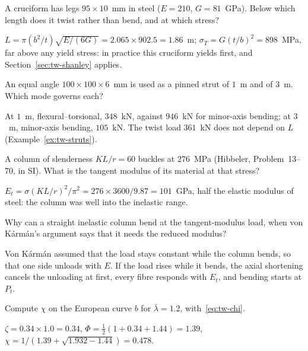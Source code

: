 \label{exo:tw-crossover}
%
A cruciform has legs $95\times10$~mm in steel ($E = 210$, $G = 81$~GPa). Below which length does it twist rather
than bend, and at which stress?
\begin{solution}
$L = \pi(b^2/t)\sqrt{E/(6G)} = 2.065\times902.5 = 1.86$~m; $\sigma_T = G(t/b)^2 = 898$~MPa, far above any yield
stress: in practice this cruciform yields first, and Section~\ref{sec:tw-shanley} applies.
\end{solution}

\label{exo:tw-whichmode}
%
An equal angle $100\times100\times6$~mm is used as a pinned strut of $1$~m and of $3$~m. Which mode governs each?
\begin{solution}
At $1$~m, flexural--torsional, $348$~kN, against $946$~kN for minor-axis bending; at $3$~m, minor-axis
bending, $105$~kN. The twist load $361$~kN does not depend on $L$ (Example~\ref{ex:tw-struts}).
\end{solution}

\label{exo:tw-et}
%
A column of slenderness $KL/r = 60$ buckles at $276$~MPa (Hibbeler, Problem~13--70, in SI). What is the tangent
modulus of its material at that stress?
\begin{solution}
$E_t = \sigma(KL/r)^2/\pi^2 = 276\times3600/9.87 = 101$~GPa, half the elastic modulus of steel: the column was well
into the inelastic range.
\end{solution}

\label{exo:tw-shanley-short}
%
Why can a straight inelastic column bend at the tangent-modulus load, when von K\'arm\'an's argument says
that it needs the reduced modulus?
\begin{solution}
Von K\'arm\'an assumed that the load stays constant while the column bends, so that one side unloads with
$E$. If the load rises while it bends, the axial shortening cancels the unloading at first, every fibre
responds with $E_t$, and bending starts at $P_t$.
\end{solution}

\label{exo:tw-chi}
%
Compute $\chi$ on the European curve $b$ for $\bar\lambda = 1.2$, with~\eqref{eq:tw-chi}.
\begin{solution}
$\zeta = 0.34\times1.0 = 0.34$, $\Phi = \tfrac12(1 + 0.34 + 1.44) = 1.39$, $\chi = 1/(1.39 + \sqrt{1.932 - 1.44}) = 0.478$.
\end{solution}

